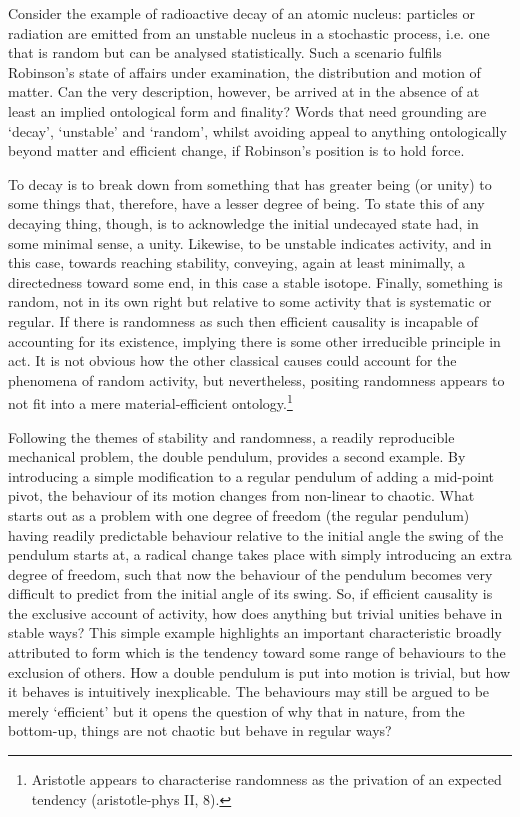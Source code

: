 Consider the example of radioactive decay of an atomic nucleus: particles or radiation are emitted from an unstable nucleus in a stochastic process, i.e. one that is random but can be analysed statistically. Such a scenario fulfils Robinson's state of affairs under examination, the distribution and motion of matter. Can the very description, however, be arrived at in the absence of at least an implied ontological form and finality? Words that need grounding are `decay', `unstable' and `random', whilst avoiding appeal to anything ontologically beyond matter and efficient change, if Robinson's position is to hold force.

To decay is to break down from something that has greater being (or unity) to some things that, therefore, have a lesser degree of being. To state this of any decaying thing, though, is to acknowledge the initial undecayed state had, in some minimal sense, a unity. Likewise, to be unstable indicates activity, and in this case, towards reaching stability, conveying, again at least minimally, a directedness toward some end, in this case a stable isotope. Finally, something is random, not in its own right but relative to some activity that is systematic or regular. If there is randomness as such then efficient causality is incapable of accounting for its existence, implying there is some other irreducible principle in act. It is not obvious how the other classical causes could account for the phenomena of random activity, but nevertheless, positing randomness appears to not fit into a mere material-efficient ontology.\footnote{Aristotle appears to characterise randomness as the privation of an expected tendency (\acrshort{aristotle-phys} II, 8).}

Following the themes of stability and randomness, a readily reproducible mechanical problem, the double pendulum, provides a second example. By introducing a simple modification to a regular pendulum of adding a mid-point pivot, the behaviour of its motion changes from non-linear to chaotic. What starts out as a problem with one degree of freedom (the regular pendulum) having readily predictable behaviour relative to the initial angle the swing of the pendulum starts at, a radical change takes place with simply introducing an extra degree of freedom, such that now the behaviour of the pendulum becomes very difficult to predict from the initial angle of its swing. So, if efficient causality is the exclusive account of activity, how does anything but trivial unities behave in stable ways? This simple example highlights an important characteristic broadly attributed to form which is the tendency toward some range of behaviours to the exclusion of others. How a double pendulum is put into motion is trivial, but how it behaves is intuitively inexplicable. The behaviours may still be argued to be merely `efficient' but it opens the question of why that in nature, from the bottom-up, things are not chaotic but behave in regular ways?

